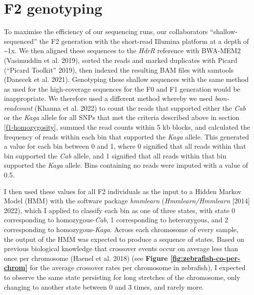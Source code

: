 \documentclass[
]{book}
\begin{document}
\clearpage

\hypertarget{somite-f2-sequencing}{%
\section{F2 genotyping}\label{somite-f2-sequencing}}

To maximise the efficiency of our sequencing runs, our collaborators ``shallow-sequenced'' the F2 generation with the short-read Illumina platform at a depth of \textasciitilde1x. We then aligned these sequences to the \emph{HdrR} reference with BWA-MEM2 (Vasimuddin et al. 2019), sorted the reads and marked duplicates with Picard ({``Picard Toolkit''} 2019), then indexed the resulting BAM files with samtools (Danecek et al. 2021). Genotyping these shallow sequences with the same method as used for the high-coverage sequences for the F0 and F1 generation would be inappropriate. We therefore used a different method whereby we used \emph{bam-readcount} (Khanna et al. 2022) to count the reads that supported either the \emph{Cab} or the \emph{Kaga} allele for all SNPs that met the criteria described above in section \ref{f1-homozygosity}, summed the read counts within 5 kb blocks, and calculated the frequency of reads within each bin that supported the \emph{Kaga} allele. This generated a value for each bin between 0 and 1, where 0 signified that all reads within that bin supported the \emph{Cab} allele, and 1 signified that all reads within that bin supported the \emph{Kaga} allele. Bins containing no reads were imputed with a value of 0.5.

I then used these values for all F2 individuals as the input to a Hidden Markov Model (HMM) with the software package \emph{hmmlearn} (\emph{Hmmlearn/Hmmlearn} {[}2014{]} 2022), which I applied to classify each bin as one of three states, with state 0 corresponding to homozygous-\emph{Cab}, 1 corresponding to heterozygous, and 2 corresponding to homozygous-\emph{Kaga}. Across each chromosome of every sample, the output of the HMM was expected to produce a sequence of states. Based on previous biological knowledge that crossover events occur on average less than once per chromosome (Haenel et al. 2018) (see \textbf{Figure \ref{fig:zebrafish-co-per-chrom}} for the average crossover rates per chromosome in zebrafish), I expected to observe the same state persisting for long stretches of the chromosome, only changing to another state between 0 and 3 times, and rarely more.
\end{document}
